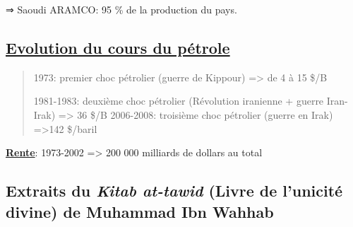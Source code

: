 ⇒ Saoudi ARAMCO: 95 \% de la production du pays.

\hypertarget{evolution-du-cours-du-puxe9trole}{%
\subsection{\texorpdfstring{\underline{Evolution du cours du
pétrole}}{Evolution du cours du pétrole}}\label{evolution-du-cours-du-puxe9trole}}

\begin{quote}
1973: premier choc pétrolier (guerre de Kippour) =\textgreater{} de 4 à
15 \$/B

1981-1983: deuxième choc pétrolier (Révolution iranienne + guerre
Iran-Irak) =\textgreater{} 36 \$/B 2006-2008: troisième choc pétrolier
(guerre en Irak) =\textgreater142 \$/baril
\end{quote}

\textbf{\underline{Rente}}: 1973-2002 =\textgreater{} 200 000 milliards
de dollars au total

\hypertarget{extraits-du-kitab-at-tawid-livre-de-lunicituxe9-divine-de-muhammad-ibn-wahhab}{%
\subsection{\texorpdfstring{Extraits du \emph{Kitab at-tawid} (Livre de
l'unicité divine) de Muhammad Ibn
Wahhab}{Extraits du Kitab at-tawid (Livre de l'unicité divine) de Muhammad Ibn Wahhab}}\label{extraits-du-kitab-at-tawid-livre-de-lunicituxe9-divine-de-muhammad-ibn-wahhab}}

